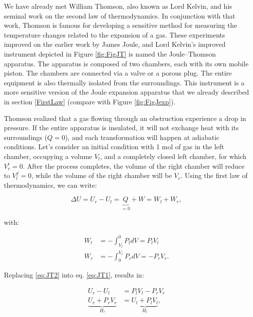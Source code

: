 \documentclass[
  9pt,
]{extbook}
\theoremstyle{definition}
\theoremstyle{definition}
\theoremstyle{definition}
\theoremstyle{remark}
\begin{document}
We have already met William Thomson, also known as Lord Kelvin, and his seminal work on the second law of thermodynamics. In conjunction with that work, Thomson is famous for developing a sensitive method for measuring the temperature changes related to the expansion of a gas. These experiments improved on the earlier work by James Joule, and Lord Kelvin's improved instrument depicted in Figure \ref{fig:FigJT} is named the Joule--Thomson apparatus. The apparatus is composed of two chambers, each with its own mobile piston. The chambers are connected via a valve or a porous plug. The entire equipment is also thermally isolated from the surroundings. This instrument is a more sensitive version of the Joule expansion apparatus that we already described in section \ref{FirstLaw} (compare with Figure \ref{fig:FigJexp}).

Thomson realized that a gas flowing through an obstruction experience a drop in pressure. If the entire apparatus is insulated, it will not exchange heat with its surroundings (\(Q=0\)), and each transformation will happen at adiabatic conditions. Let's consider an initial condition with 1 mol of gas in the left chamber, occupying a volume \(V_l\), and a completely closed left chamber, for which \(V_r^i=0\). After the process completes, the volume of the right chamber will reduce to \(V_l^f=0\), while the volume of the right chamber will be \(V_r\). Using the first law of thermodynamics, we can write:

\begin{equation}
\Delta U=U_r-U_l=\underbrace{Q}_{=0}+W=W_l+W_r,
\label{eq:JT1}
\end{equation}

with:

\begin{equation}
\begin{aligned}
W_l &=-\int_{V_l}^0 P_l dV = P_l V_l\\
W_r &=-\int_0^{V_r} P_r dV = - P_r V_r.
\end{aligned}
\label{eq:JT2}
\end{equation}

Replacing \eqref{eq:JT2} into eq. \eqref{eq:JT1}, results in:

\begin{equation}
\begin{aligned}
U_r-U_l &=P_l V_l-P_r V_r \\
\underbrace{U_r+P_r V_r}_{H_r} &= \underbrace{U_l + P_l V_l}_{H_l},
\end{aligned}
\label{eq:JT3}
\end{equation}
\end{document}
